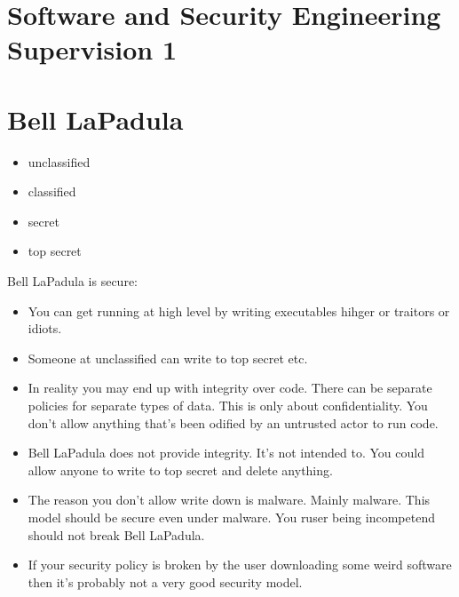 \documentclass[10pt, a4paper]{article}
\begin{document}
\section*{Software and Security Engineering Supervision 1}

\section{Bell LaPadula}

\begin{itemize}

\item unclassified

\item classified

\item secret

\item top secret

\end{itemize}

Bell LaPadula is secure:

\begin{itemize}

\item You can get running at high level by writing executables hihger or traitors or idiots.

\item Someone at unclassified can write to top secret etc.

\item In reality you may end up with integrity over code. There can be separate policies for
separate types of data. This is only about confidentiality. You don't allow anything that's been odified by an
untrusted actor to run code.

\item Bell LaPadula does not provide integrity. It's not intended to. You could allow anyone to write
to top secret and delete anything.

\item The reason you don't allow write down is malware. Mainly malware. This model should be
secure even under malware. You ruser being incompetend should not break Bell LaPadula.

\item If your security policy is broken by the user downloading some weird software then it's probably not
a very good security model.

\end{itemize}
\end{document}
